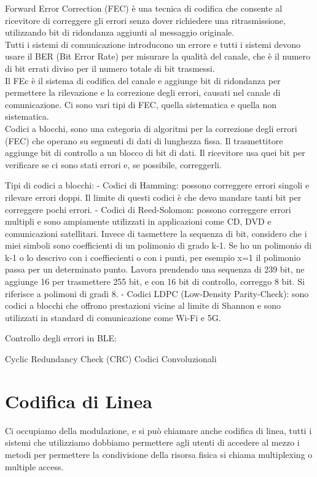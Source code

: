 Forward Error Correction (FEC) è una tecnica di codifica che consente al ricevitore 
di correggere gli errori senza dover richiedere una ritrasmissione, utilizzando bit 
di ridondanza aggiunti al messaggio originale.\\

Tutti i sistemi di comunicazione introducono un errore e tutti i sistemi devono usare il BER
(Bit Error Rate) per misurare la qualità del canale, che è il numero di bit errati diviso
per il numero totale di bit trasmessi.\\

Il FEc è il sistema di codifica del canale e aggiunge bit di ridondanza per permettere la 
rilevazione e la correzione degli errori, causati nel canale di comunicazione. 
Ci sono vari tipi di FEC, quella sistematica e quella non sistematica.\\

Codici a blocchi, sono una categoria di algoritmi per la correzione degli errori (FEC) che
operano su segmenti di dati di lunghezza fissa. Il trasmettitore aggiunge bit di controllo 
a un blocco di bit di dati. Il ricevitore usa quei bit per verificare se ci sono stati errori e, 
se possibile, correggerli.

Tipi di codici a blocchi:
- Codici di Hamming: possono correggere errori singoli e rilevare errori doppi.
Il limite di questi codici è che devo mandare tanti bit per correggere pochi errori.
- Codici di Reed-Solomon: possono correggere errori multipli e sono ampiamente 
utilizzati in applicazioni come CD, DVD e comunicazioni satellitari.
Invece di tasmettere la sequenza di bit, considero che i miei simboli sono coefficienti
di un polimonio di grado k-1. Se ho un polimonio di k-1 o lo descrivo con i coeffiecienti 
o con i punti, per esempio x=1 il polimonio passa per un determinato punto.
Lavora prendendo una sequenza di 239 bit, ne aggiunge 16 per trasmettere 255 bit, e 
con 16 bit di controllo, correggo 8 bit.
Si riferisce a polimoni di gradi 8.
- Codici LDPC (Low-Density Parity-Check): sono codici a blocchi che offrono prestazioni 
vicine al limite di Shannon e sono utilizzati in standard di comunicazione come Wi-Fi e 5G.


Controllo degli errori in BLE:

Cyclic Redundancy Check (CRC)
Codici Convoluzionali


\section{Codifica di Linea}
Ci occupiamo della modulazione, e si può chiamare anche codifica di linea, 
tutti i sistemi che utilizziamo dobbiamo permettere agli utenti di accedere al mezzo 
i metodi per permettere la condivisione della risorsa fisica si chiama multiplexing o 
multiple access. 

